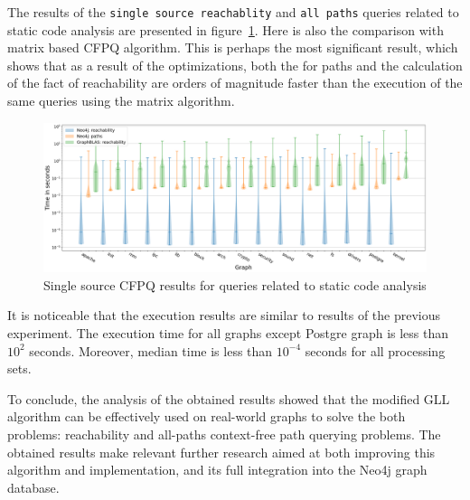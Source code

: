 The results of the \texttt{single source reachablity} and \texttt{all paths} queries  related to static code analysis are presented in figure~\ref{fig:ss-stat}. Here is also the comparison with matrix based CFPQ algorithm. 
This is perhaps the most significant result, which shows that as a result of the optimizations, both the  for paths and the calculation of the fact of reachability are orders of magnitude faster than the execution of the same queries using the matrix algorithm.

\begin{figure}
    \centering
    \includegraphics[width=\textwidth]{figures/stat-m.png}
    \caption{Single source CFPQ results for queries related to static code analysis}
    \label{fig:ss-stat}
\end{figure}

It is noticeable that the execution results are similar to results of the previous experiment. The execution time for all graphs except Postgre graph is less than $10^2$ seconds. Moreover, median time is less than $10^{-4}$ seconds for all processing sets.

To conclude, the analysis of the obtained results showed that the modified GLL algorithm can be effectively used on real-world graphs to solve the both problems: reachability and all-paths context-free path querying problems.
The obtained results make relevant further research aimed at both improving this algorithm and implementation, and its full integration into the Neo4j graph database.